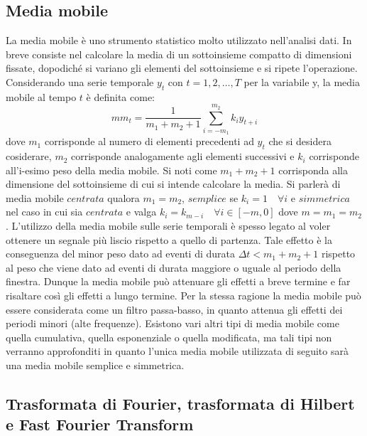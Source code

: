 \documentclass[12pt,a4paper, twoside, openright]{report}
\begin{document}
\subsection{Media mobile}

La media mobile è uno strumento statistico molto utilizzato nell'analisi dati.
In breve consiste nel calcolare la media di un sottoinsieme compatto di dimensioni fissate, dopodiché si variano gli elementi del sottoinsieme e si ripete l'operazione.
Considerando una serie temporale {$y_t$} con $t = 1,2,\ldots,T$ per la variabile y, la media mobile al tempo $t$ è definita come:
\begin{equation}
	mm_t = \frac{1}{m_1+m_2+1} \displaystyle \sum_{i=-m_1}^{m_2} k_iy_{t+i} 
\end{equation}
dove $m_1$ corrisponde al numero di elementi precedenti ad $y_t$ che si desidera cosiderare, $m_2$ corrisponde analogamente agli elementi successivi e $k_i$ corrisponde all'i-esimo peso della media mobile.
Si noti come $m_1+m_2+1$ corrisponda alla dimensione del sottoinsieme di cui si intende calcolare la media.
Si parlerà di media mobile $centrata$ qualora $m_1=m_2$, $semplice$ se $k_i=1 \quad \forall i$ e $simmetrica$ nel caso in cui sia $centrata$ e valga $k_i=k_{m-i} \quad \forall i \in [-m, 0]$ dove $m=m_1=m_2$.
L'utilizzo della media mobile sulle serie temporali è spesso legato al voler ottenere un segnale più liscio rispetto a quello di partenza.
Tale effetto è la conseguenza del minor peso dato ad eventi di durata $\Delta t < m_1+m_2+1$ rispetto al peso che viene dato ad eventi di durata maggiore o uguale al periodo della finestra.
Dunque la media mobile può attenuare gli effetti a breve termine e far risaltare così gli effetti a lungo termine.
Per la stessa ragione la media mobile può essere considerata come un filtro passa-basso, in quanto attenua gli effetti dei periodi minori (alte frequenze).
Esistono vari altri tipi di media mobile come quella cumulativa, quella esponenziale o quella modificata, ma tali tipi non verranno approfonditi in quanto l'unica media mobile utilizzata di seguito sarà una media mobile semplice e simmetrica.


\subsection{Trasformata di Fourier, trasformata di Hilbert e Fast Fourier Transform}
\end{document}
